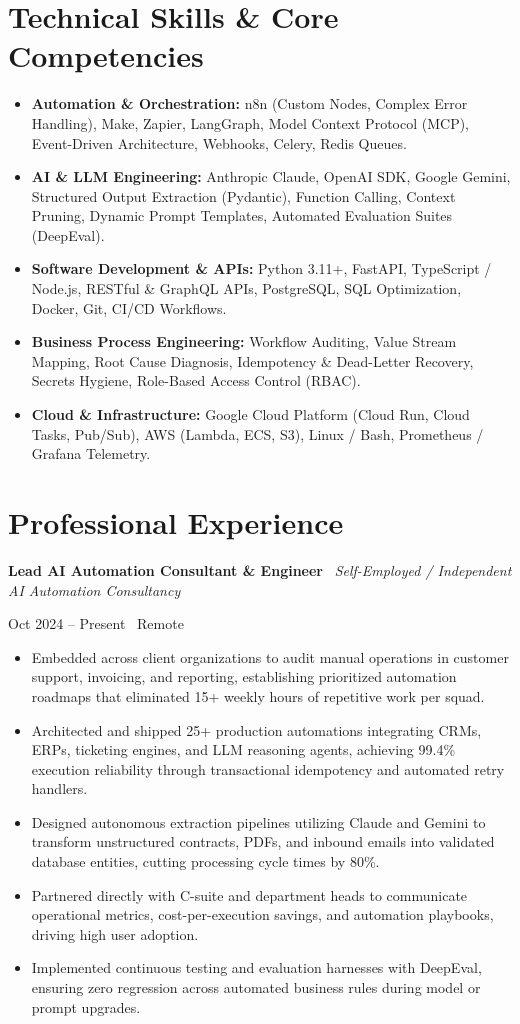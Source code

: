 \documentclass[a4paper,10pt]{article}
\newcommand{\role}[4]{%
  \vspace{2pt}\noindent
  \begin{minipage}[t]{0.70\textwidth}\raggedright\textbf{#1} \textbullet\ \textit{#3}\end{minipage}%
  \hfill
  \begin{minipage}[t]{0.28\textwidth}\raggedleft\footnotesize\color{gray}#2 \textbullet\ #4\end{minipage}%
  \vspace{1pt}%
}
\begin{document}
\section{Technical Skills \& Core Competencies}
\begin{itemize}[leftmargin=1.2em, itemsep=2pt]
  \item \textbf{Automation \& Orchestration:} n8n (Custom Nodes, Complex Error Handling), Make, Zapier, LangGraph, Model Context Protocol (MCP), Event-Driven Architecture, Webhooks, Celery, Redis Queues.
  \item \textbf{AI \& LLM Engineering:} Anthropic Claude, OpenAI SDK, Google Gemini, Structured Output Extraction (Pydantic), Function Calling, Context Pruning, Dynamic Prompt Templates, Automated Evaluation Suites (DeepEval).
  \item \textbf{Software Development \& APIs:} Python 3.11+, FastAPI, TypeScript / Node.js, RESTful \& GraphQL APIs, PostgreSQL, SQL Optimization, Docker, Git, CI/CD Workflows.
  \item \textbf{Business Process Engineering:} Workflow Auditing, Value Stream Mapping, Root Cause Diagnosis, Idempotency \& Dead-Letter Recovery, Secrets Hygiene, Role-Based Access Control (RBAC).
  \item \textbf{Cloud \& Infrastructure:} Google Cloud Platform (Cloud Run, Cloud Tasks, Pub/Sub), AWS (Lambda, ECS, S3), Linux / Bash, Prometheus / Grafana Telemetry.
\end{itemize}

\section{Professional Experience}

\role{Lead AI Automation Consultant \& Engineer}{Oct 2024 -- Present}{Self-Employed / Independent AI Automation Consultancy}{Remote}
\begin{itemize}
  \item Embedded across client organizations to audit manual operations in customer support, invoicing, and reporting, establishing prioritized automation roadmaps that eliminated 15+ weekly hours of repetitive work per squad.
  \item Architected and shipped 25+ production automations integrating CRMs, ERPs, ticketing engines, and LLM reasoning agents, achieving 99.4\% execution reliability through transactional idempotency and automated retry handlers.
  \item Designed autonomous extraction pipelines utilizing Claude and Gemini to transform unstructured contracts, PDFs, and inbound emails into validated database entities, cutting processing cycle times by 80\%.
  \item Partnered directly with C-suite and department heads to communicate operational metrics, cost-per-execution savings, and automation playbooks, driving high user adoption.
  \item Implemented continuous testing and evaluation harnesses with DeepEval, ensuring zero regression across automated business rules during model or prompt upgrades.
\end{itemize}
\end{document}
